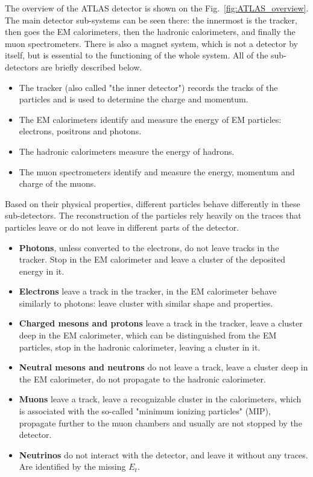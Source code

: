 The overview of the ATLAS detector is shown on the Fig.~\ref{fig:ATLAS_overview}. The main detector sub-systems can be seen there: the innermost is the tracker, then goes the EM calorimeters, then the hadronic calorimeters, and finally the muon spectrometers. There is also a magnet system, which is not a detector by itself, but is essential to the functioning of the whole system. All of the sub-detectors are briefly described below.

\begin{itemize}
\item The tracker (also called "the inner detector") records the tracks of the particles and is used to determine the charge and momentum.
\item The EM calorimeters identify and measure the energy of EM particles: electrons, positrons and photons.
\item The hadronic calorimeters measure the energy of hadrons.
\item The muon spectrometers identify and measure the energy, momentum and charge of the muons.
\end{itemize}

Based on their physical properties, different particles behave differently in these sub-detectors. The reconstruction of the particles rely heavily on the traces that particles leave or do not leave in different parts of the detector.

\begin{itemize}
\item {\bfseries Photons}, unless converted to the electrons, do not leave tracks in the tracker. Stop in the EM calorimeter and leave a cluster of the deposited energy in it.
\item {\bfseries Electrons} leave a track in the tracker, in the EM calorimeter behave similarly to photons: leave cluster with similar shape and properties.
\item {\bfseries Charged mesons and protons} leave a track in the tracker, leave a cluster deep in the EM calorimeter, which can be distinguished from the EM particles, stop in the hadronic calorimeter, leaving a cluster in it.
\item {\bfseries Neutral mesons and neutrons} do not leave a track, leave a cluster deep in the EM calorimeter, do not propagate to the hadronic calorimeter.
\item {\bfseries Muons} leave a track, leave a recognizable cluster in the calorimeters, which is associated with the so-called "minimum ionizing particles" (MIP), propagate further to the muon chambers and usually are not stopped by the detector.
\item {\bfseries Neutrinos} do not interact with the detector, and leave it without any traces. Are identified by the missing $E_{t}$.
\end{itemize}

